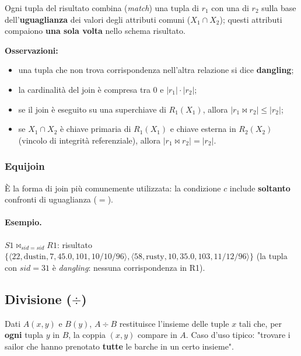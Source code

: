 \documentclass[12pt, a4paper]{article}
\begin{document}
Ogni tupla del risultato combina (\textit{match}) una tupla di $r_1$ con una di $r_2$ sulla base dell'\textbf{uguaglianza} dei valori degli attributi comuni ($X_1 \cap X_2$); questi attributi compaiono \textbf{una sola volta} nello schema risultato.

\textbf{Osservazioni:}
\begin{itemize}
    \item una tupla che non trova corrispondenza nell'altra relazione si dice \textbf{dangling};
    \item la cardinalità del join è compresa tra 0 e $|r_1| \cdot |r_2|$;
    \item se il join è eseguito su una superchiave di $R_1(X_1)$, allora $|r_1 \bowtie r_2| \leq |r_2|$;
    \item se $X_1 \cap X_2$ è chiave primaria di $R_1(X_1)$ e chiave esterna in $R_2(X_2)$ (vincolo di integrità referenziale), allora $|r_1 \bowtie r_2| = |r_2|$.
\end{itemize}

\subsubsection{Equijoin}

È la forma di join più comunemente utilizzata: la condizione $c$ include \textbf{soltanto} confronti di uguaglianza ($=$).

\paragraph{Esempio.} $S1 \bowtie_{sid=sid} R1$: risultato $\{\langle 22,\text{dustin},7,45.0,101,\text{10/10/96}\rangle, \langle 58,\text{rusty},10,35.0,103,\text{11/12/96}\rangle\}$ (la tupla con $sid=31$ è \textit{dangling}: nessuna corrispondenza in R1).


\subsection{Divisione ($\div$)}

Dati $A(x,y)$ e $B(y)$, $A \div B$ restituisce l'insieme delle tuple $x$ tali che, per \textbf{ogni} tupla $y$ in $B$, la coppia $(x,y)$ compare in $A$. Caso d'uso tipico: "trovare i sailor che hanno prenotato \textbf{tutte} le barche in un certo insieme".
\end{document}
